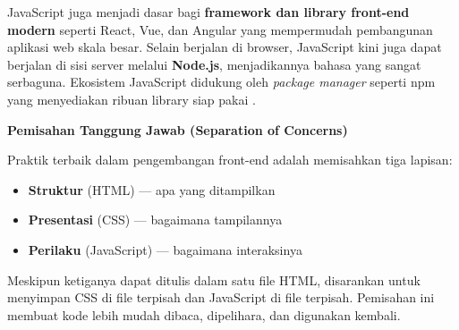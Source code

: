 JavaScript juga menjadi dasar bagi \textbf{framework dan library front-end modern} seperti React, Vue, dan Angular yang mempermudah pembangunan aplikasi web skala besar. Selain berjalan di browser, JavaScript kini juga dapat berjalan di sisi server melalui \textbf{Node.js}, menjadikannya bahasa yang sangat serbaguna. Ekosistem JavaScript didukung oleh \textit{package manager} seperti npm yang menyediakan ribuan library siap pakai \cite{eloquentJs}.


\begin{konsep}
\textbf{Pemisahan Tanggung Jawab (Separation of Concerns)}

Praktik terbaik dalam pengembangan front-end adalah memisahkan tiga lapisan:
\begin{itemize}
  \item \textbf{Struktur} (HTML) --- apa yang ditampilkan
  \item \textbf{Presentasi} (CSS) --- bagaimana tampilannya
  \item \textbf{Perilaku} (JavaScript) --- bagaimana interaksinya
\end{itemize}
Meskipun ketiganya dapat ditulis dalam satu file HTML, disarankan untuk menyimpan CSS di file  terpisah dan JavaScript di file  terpisah. Pemisahan ini membuat kode lebih mudah dibaca, dipelihara, dan digunakan kembali.
\end{konsep}


